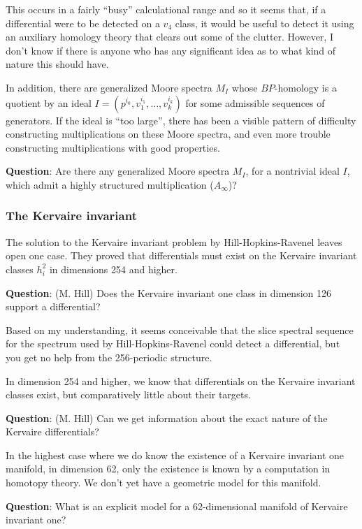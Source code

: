 \documentclass[12pt,titlepage]{article}
\theoremstyle{plain}
\theoremstyle{definition}
\theoremstyle{remark}
\begin{document}
This occurs in a fairly ``{}busy''{} calculational range and so it seems that, if a differential were to be detected on a $v_4$ class, it would be useful to detect it using an auxiliary homology theory that clears out some of the clutter. However, I don'{}t know if there is anyone who has any significant idea as to what kind of nature this should have.

In addition, there are generalized Moore spectra $M_I$ whose $BP$-homology is a quotient by an ideal $I =
(p^{i_0},v_1^{i_1},\ldots,v_k^{i_k})$ for some admissible sequences of generators. If the ideal is ``{}too large''{}, there has been a visible pattern of difficulty constructing multiplications on these Moore spectra, and even more trouble constructing multiplications with good properties.

\textbf{Question}: Are there any generalized Moore spectra $M_I$, for a nontrivial ideal $I$, which admit a highly structured multiplication ($A_\infty$)?

\hypertarget{the_kervaire_invariant_3}{}\subsubsection{{The Kervaire invariant}}\label{the_kervaire_invariant_3}

The solution to the Kervaire invariant problem by Hill-Hopkins-Ravenel leaves open one case. They proved that differentials must exist on the Kervaire invariant classes $h_i^2$ in dimensions 254 and higher.

\textbf{Question}: (M. Hill) Does the Kervaire invariant one class in dimension 126 support a differential?

Based on my understanding, it seems conceivable that the slice spectral sequence for the spectrum used by Hill-Hopkins-Ravenel could detect a differential, but you get no help from the 256-periodic structure.

In dimension 254 and higher, we know that differentials on the Kervaire invariant classes exist, but comparatively little about their targets.

\textbf{Question}: (M. Hill) Can we get information about the exact nature of the Kervaire differentials?

In the highest case where we do know the existence of a Kervaire invariant one manifold, in dimension 62, only the existence is known by a computation in homotopy theory. We don'{}t yet have a geometric model for this manifold.

\textbf{Question}: What is an explicit model for a 62-dimensional manifold of Kervaire invariant one?
\end{document}
